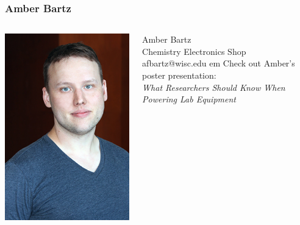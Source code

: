 \documentclass{presentation}
\begin{document}
\begin{frame}\frametitle{Amber Bartz}
  \begin{columns}
    \begin{column}{0.33\textwidth}
      \includegraphics[width=\textwidth]{"./Thompson_Blaise_LowRes.jpg"}
    \end{column}
    \begin{column}{0.67\textwidth}
      Amber Bartz \\
      Chemistry Electronics Shop \\
      afbartz@wisc.edu
       em
      Check out Amber's poster presentation: \\
      \emph{What Researchers Should Know When Powering Lab Equipment}
    \end{column}
  \end{columns}
\end{frame}
\end{document}
